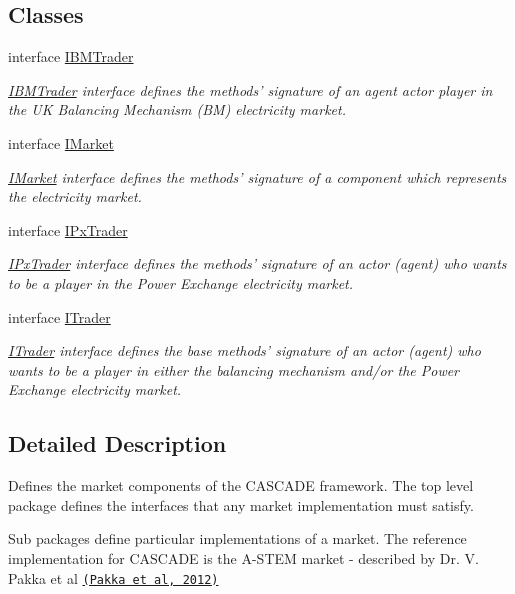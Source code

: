 \subsection*{Classes}
\begin{DoxyCompactItemize}
\item 
interface \hyperlink{interfaceuk_1_1ac_1_1dmu_1_1iesd_1_1cascade_1_1market_1_1_i_b_m_trader}{I\-B\-M\-Trader}
\begin{DoxyCompactList}\small\item\em {\itshape \hyperlink{interfaceuk_1_1ac_1_1dmu_1_1iesd_1_1cascade_1_1market_1_1_i_b_m_trader}{I\-B\-M\-Trader}} interface defines the methods' signature of an agent actor player in the U\-K Balancing Mechanism (B\-M) electricity market. \end{DoxyCompactList}\item 
interface \hyperlink{interfaceuk_1_1ac_1_1dmu_1_1iesd_1_1cascade_1_1market_1_1_i_market}{I\-Market}
\begin{DoxyCompactList}\small\item\em {\itshape \hyperlink{interfaceuk_1_1ac_1_1dmu_1_1iesd_1_1cascade_1_1market_1_1_i_market}{I\-Market}} interface defines the methods' signature of a component which represents the electricity market. \end{DoxyCompactList}\item 
interface \hyperlink{interfaceuk_1_1ac_1_1dmu_1_1iesd_1_1cascade_1_1market_1_1_i_px_trader}{I\-Px\-Trader}
\begin{DoxyCompactList}\small\item\em {\itshape \hyperlink{interfaceuk_1_1ac_1_1dmu_1_1iesd_1_1cascade_1_1market_1_1_i_px_trader}{I\-Px\-Trader}} interface defines the methods' signature of an actor (agent) who wants to be a player in the {\ttfamily Power Exchange} electricity market. \end{DoxyCompactList}\item 
interface \hyperlink{interfaceuk_1_1ac_1_1dmu_1_1iesd_1_1cascade_1_1market_1_1_i_trader}{I\-Trader}
\begin{DoxyCompactList}\small\item\em {\itshape \hyperlink{interfaceuk_1_1ac_1_1dmu_1_1iesd_1_1cascade_1_1market_1_1_i_trader}{I\-Trader}} interface defines the base methods' signature of an actor (agent) who wants to be a player in either the balancing mechanism and/or the {\ttfamily Power Exchange} electricity market. \end{DoxyCompactList}\end{DoxyCompactItemize}


\subsection{Detailed Description}
Defines the market components of the C\-A\-S\-C\-A\-D\-E framework. The top level package defines the interfaces that any market implementation must satisfy.

Sub packages define particular implementations of a market. The reference implementation for C\-A\-S\-C\-A\-D\-E is the A-\/\-S\-T\-E\-M market -\/ described by Dr. V. Pakka et al \href{https://www.dora.dmu.ac.uk/xmlui/handle/2086/7554}{\tt (Pakka et al, 2012)} 